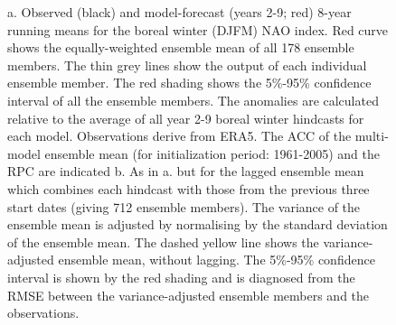 \documentclass{article}
\begin{document}
\begin{figure}
    \centering
    \caption{ a. Observed (black) and model-forecast (years 2-9; red) 8-year running means for the boreal winter (DJFM) NAO index. Red curve shows the equally-weighted ensemble mean of all 178 ensemble members. The thin grey lines show the output of each individual ensemble member. The red shading shows the 5\%-95\% confidence interval of all the ensemble members. The anomalies are calculated relative to the average of all year 2-9 boreal winter hindcasts for each model. Observations derive from ERA5. The ACC of the multi-model ensemble mean (for initialization period: 1961-2005) and the RPC are indicated b. As in a. but for the lagged ensemble mean which combines each hindcast with those from the previous three start dates (giving 712 ensemble members). The variance of the ensemble mean is adjusted by normalising by the standard deviation of the ensemble mean. The dashed yellow line shows the variance-adjusted ensemble mean, without lagging. The 5\%-95\% confidence interval is shown by the red shading and is diagnosed from the RMSE between the variance-adjusted ensemble members and the observations.}
    \label{fig:multi-model-means}
\end{figure}
\end{document}
